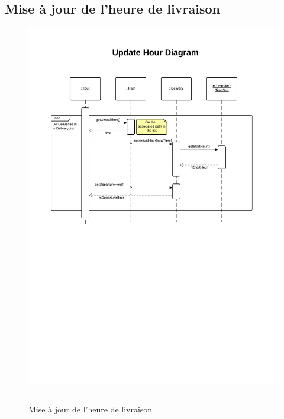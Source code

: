 \subsection{Mise à jour de l'heure de livraison}
\begin{figure}[H]
	\centering
		\includegraphics[width=\textwidth,height=\textheight,keepaspectratio, angle=90]{Figures/heure}
		\rule{35em}{0.5pt}
	\caption[Mise à jour de l'heure de livraison]{Mise à jour de l'heure de livraison}
\end{figure}
\clearpage